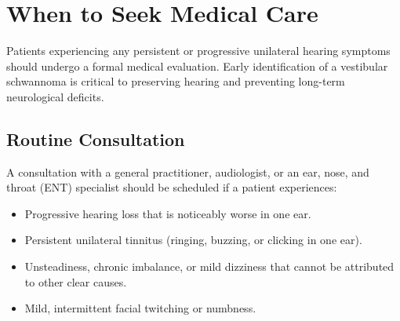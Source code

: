 \section*{When to Seek Medical Care}
Patients experiencing any persistent or progressive unilateral hearing symptoms should undergo a formal medical evaluation. Early identification of a vestibular schwannoma is critical to preserving hearing and preventing long-term neurological deficits.

\subsection*{Routine Consultation}
A consultation with a general practitioner, audiologist, or an ear, nose, and throat (ENT) specialist should be scheduled if a patient experiences:
\begin{itemize}
    \item Progressive hearing loss that is noticeably worse in one ear.
    \item Persistent unilateral tinnitus (ringing, buzzing, or clicking in one ear).
    \item Unsteadiness, chronic imbalance, or mild dizziness that cannot be attributed to other clear causes.
    \item Mild, intermittent facial twitching or numbness.
\end{itemize}

